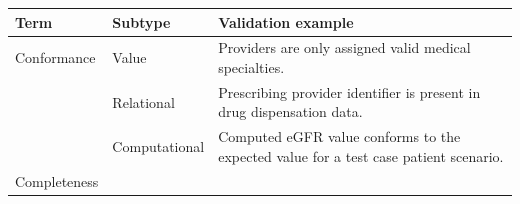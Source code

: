 \documentclass[11pt]{book}
\begin{document}
\begin{longtable}[]{@{}lll@{}}
\toprule
\begin{minipage}[b]{0.09\columnwidth}\raggedright\strut
Term\strut
\end{minipage} & \begin{minipage}[b]{0.16\columnwidth}\raggedright\strut
Subtype\strut
\end{minipage} & \begin{minipage}[b]{0.67\columnwidth}\raggedright\strut
Validation example\strut
\end{minipage}\tabularnewline
\midrule
\endhead
\begin{minipage}[t]{0.09\columnwidth}\raggedright\strut
Conformance\strut
\end{minipage} & \begin{minipage}[t]{0.16\columnwidth}\raggedright\strut
Value\strut
\end{minipage} & \begin{minipage}[t]{0.67\columnwidth}\raggedright\strut
Providers are only assigned valid medical specialties.\strut
\end{minipage}\tabularnewline
\begin{minipage}[t]{0.09\columnwidth}\raggedright\strut
\strut
\end{minipage} & \begin{minipage}[t]{0.16\columnwidth}\raggedright\strut
Relational\strut
\end{minipage} & \begin{minipage}[t]{0.67\columnwidth}\raggedright\strut
Prescribing provider identifier is present in drug dispensation
data.\strut
\end{minipage}\tabularnewline
\begin{minipage}[t]{0.09\columnwidth}\raggedright\strut
\strut
\end{minipage} & \begin{minipage}[t]{0.16\columnwidth}\raggedright\strut
Computational\strut
\end{minipage} & \begin{minipage}[t]{0.67\columnwidth}\raggedright\strut
Computed eGFR value conforms to the expected value for a test case
patient scenario.\strut
\end{minipage}\tabularnewline
\begin{minipage}[t]{0.09\columnwidth}\raggedright\strut
Completeness\strut
\end{minipage} & \begin{minipage}[t]{0.16\columnwidth}\raggedright\strut

\end{minipage}
\end{longtable}
\end{document}
